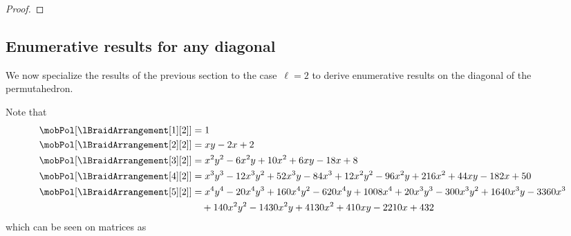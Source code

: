 \begin{proof}
\end{proof}

\subsection{Enumerative results for any diagonal} 
\label{s:facets}

We now specialize the results of the previous section to the case~$\ell = 2$ to derive enumerative results on the diagonal of the permutahedron.

Note that
\begin{align*}
\mobPol[{\lBraidArrangement[1][2]}] & = 1 \\
\mobPol[{\lBraidArrangement[2][2]}] & = x y - 2 x + 2 \\
\mobPol[{\lBraidArrangement[3][2]}] & = x^2 y^2 - 6 x^2 y + 10 x^2 + 6 x y - 18 x + 8 \\
\mobPol[{\lBraidArrangement[4][2]}] & = x^3 y^3 - 12 x^3 y^2 + 52 x^3 y - 84 x^3 + 12 x^2 y^2 - 96 x^2 y + 216 x^2 + 44 x y - 182 x + 50 \\
\mobPol[{\lBraidArrangement[5][2]}] & = x^4 y^4 - 20 x^4 y^3 + 160 x^4 y^2 - 620 x^4 y + 1008 x^4 + 20 x^3 y^3 - 300 x^3 y^2 + 1640 x^3 y - 3360 x^3 \\ & \quad+ 140 x^2 y^2 - 1430 x^2 y + 4130 x^2 + 410 x y - 2210 x + 432
\end{align*}
which can be seen on matrices as
